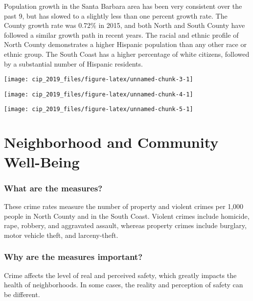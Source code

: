 \documentclass[]{book}
\theoremstyle{definition}
\theoremstyle{definition}
\theoremstyle{definition}
\theoremstyle{remark}
\begin{document}
Population growth in the Santa Barbara area has been very consistent
over the past 9, but has slowed to a slightly less than one percent
growth rate. The County growth rate was 0.72\% in 2015, and both North
and South County have followed a similar growth path in recent years.
The racial and ethnic profile of North County demonstrates a higher
Hispanic population than any other race or ethnic group. The South Coast
has a higher percentage of white citizens, followed by a substantial
number of Hispanic residents.

\begin{center}\texttt{[image: cip\_2019\_files/figure-latex/unnamed-chunk-3-1]} \end{center}

\texttt{[image: cip\_2019\_files/figure-latex/unnamed-chunk-4-1]}

\texttt{[image: cip\_2019\_files/figure-latex/unnamed-chunk-5-1]}

\section*{Neighborhood and Community
Well-Being}\label{neighborhood-and-community-well-being}

\subsubsection*{What are the measures?}\label{what-are-the-measures-1}

These crime rates measure the number of property and violent crimes per
1,000 people in North County and in the South Coast. Violent crimes
include homicide, rape, robbery, and aggravated assault, whereas
property crimes include burglary, motor vehicle theft, and
larceny-theft.

\subsubsection*{Why are the measures
important?}\label{why-are-the-measures-important}

Crime affects the level of real and perceived safety, which greatly
impacts the health of neighborhoods. In some cases, the reality and
perception of safety can be different.
\end{document}
